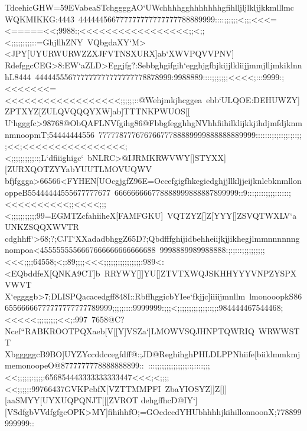 {{ \hbox{TdcehicGHW=59EVabeaSTchggggAO`UWchhhhgghhhhhhhgfihlljljlkljjkkmlllmcWQKMIKKG:4443%
 444444566777777777777777788889999::::;;;;;;<;;;<<<=<=====<<;9988:;<<<<<<<<<<<<<<<<<;;<;;<;;;;;;;;;::=GhjllhZNY%
 VQbgdaXY`M><JPY[UYURWURWZZXJFVTNSXURX]ab`XWVPQVVPNV]}
 \hbox{RdefggcCEG>8:EW`aZLD>Eggjfg?:Sebbghgifgih`egghjgfhjkijjlkliijjmmjlljmkiklnnhL8444%
 444445556777777777777777778878999:9988889::::;;;;;;;<<<<;:::9999:;<<<<<<<=<<<<<<<<<<<<<<<<<<;;;;;;::@Wehjmkjhcggea%
 ebb`ULQOE:DEHUWZY]ZPTXYZ[ZULQVQQQYXW]ab]TTTNKPWUOS[[}
 \hbox{U`hgggfc>98768@ObQAFLNVfgihg86@FbbgfegghhgNVhhfiihilklijkkjihdjmfdjknmnmnoopmT;54444444556%
 77777877767676677788889999888888889999:::::::;:;::;;:;::;;;<<;<<<<<<<<<<<<<<<<;<;;;;;;;;;;::;L`dfiiighigc`%
 bNLRC>@IJRMKRWVWY[]STYXX][ZURXQOTZYYabYUUTLMOVUQWV}
 \hbox{bfjfggga>66566<FYHEN[UOcgjgfZ96E=OccefgigfhkegiedghjjllkljjeijknlcbknmllonoppeB55444444555677777677%
 666666666778888999888887899999::9:::;::::;;;;::::::;<<<<<<<<<<;;<<<<;;;<;;;;;;;;;;;99=EGMTZcfahiiheX[FAMFGKU]%
 VQTZYZ[]Z[YYY[]ZSVQTWXLV`aUNKZSQQXWVTR}
 \hbox{cdghhff`>68;?;CJT`XXadadbhggZ65D?;Qbdfffghijidbehheiijkjjikhegjlmmnnnnnngnompoa<4555555556667666666666666688%
 9998889989988888:;:;:::;;;;;;;;;;<<<;;;;64558;<;:89;;;;<<<;;;;;;;;;;;;;;;;:989<:<EQbddfeX[QNKA9CT]b%
 RRYWY[]]YU[]ZTVTXWQJSKHHYYYVNPZYSPXVWVT}
 \hbox{X`eggggb>7;DLISPQacacedgff848I::RbffhggicbYIee`fkjjc]iiiijmnllm%
 lmonooopkS8665566666777777777777789999;;;;;::::9999999:;;;<;;;;;;;;;;;;;::;;:984444467544468;<<<<<;;;;;;;;;<<;:997%
 7658@C?Ncef``RABKROOTPQXaeb[V[[Y]VSZa`]LMOWVSQJHNPTQWRIQ%
 WRWWSTT}
 \hbox{XbgggggcB9BO]UYZYccddccegfdff@:;JD@ReghihghPHLDLPPNhiife[biiklmmkmjmemonoopeO@8777777778888888899::%
 :::;;;;;;;;;;;;;;::;::::;;;<<;;;;;;:;;;;:656854443333333333447<<<;<;;;;<<;;;;;:99766437GVKPcbfX[VZTTMMPFI%
 ZbaYIOSYZ]]Z[]][aaSMYY[UYXUQPQNJT[[[ZVROT}
 \hbox{dehgffhcD@IY`][VSdfgbVVdfgfgcOPK>MY]fihihhfO;=GOcdccdYHUbhhhhjkihillonnoonX;778899999999::%
}}}
